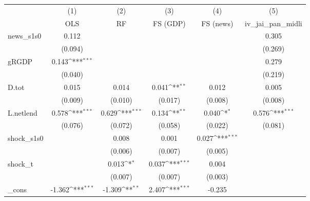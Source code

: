 {
\def\sym#1{\ifmmode^{#1}\else\(^{#1}\)\fi}
\begin{tabular}{l*{5}{c}}
\toprule
            &\multicolumn{1}{c}{(1)}&\multicolumn{1}{c}{(2)}&\multicolumn{1}{c}{(3)}&\multicolumn{1}{c}{(4)}&\multicolumn{1}{c}{(5)}\\
            &\multicolumn{1}{c}{OLS}&\multicolumn{1}{c}{RF}&\multicolumn{1}{c}{FS (GDP)}&\multicolumn{1}{c}{FS (news)}&\multicolumn{1}{c}{iv\_jai\_pan\_midli}\\
\midrule
news\_s1s0   &       0.112         &                     &                     &                     &       0.305         \\
            &     (0.094)         &                     &                     &                     &     (0.269)         \\
\addlinespace
gRGDP       &       0.143\sym{***}&                     &                     &                     &       0.279         \\
            &     (0.040)         &                     &                     &                     &     (0.219)         \\
\addlinespace
D.tot       &       0.015         &       0.014         &       0.041\sym{**} &       0.012         &       0.005         \\
            &     (0.009)         &     (0.010)         &     (0.017)         &     (0.008)         &     (0.008)         \\
\addlinespace
L.netlend   &       0.578\sym{***}&       0.629\sym{***}&       0.134\sym{**} &       0.040\sym{*}  &       0.576\sym{***}\\
            &     (0.076)         &     (0.072)         &     (0.058)         &     (0.022)         &     (0.081)         \\
\addlinespace
shock\_s1s0  &                     &       0.008         &       0.001         &       0.027\sym{***}&                     \\
            &                     &     (0.006)         &     (0.007)         &     (0.005)         &                     \\
\addlinespace
shock\_t     &                     &       0.013\sym{*}  &       0.037\sym{***}&       0.004         &                     \\
            &                     &     (0.007)         &     (0.007)         &     (0.003)         &                     \\
\addlinespace
\_cons      &      -1.362\sym{***}&      -1.309\sym{**} &       2.407\sym{***}&      -0.235         &                     \\

\end{tabular}}
